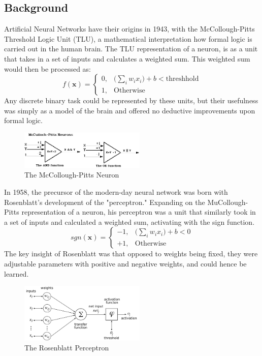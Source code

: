 \documentclass[letterpaper]{article}
\begin{document}
\subsection{Background}
Artificial Neural Networks have their origins in 1943, with the McCollough-Pitts Threshold Logic Unit (TLU), a mathematical interpretation how formal logic is carried out in the human brain.%
The TLU representation of a neuron, is as a unit that takes in a set of inputs and calculates a weighted sum. This weighted sum 
would then be processed as:
\[ 
	f(\mathbf{x}) = \begin{cases}
		0,& \big(\sum\limits_{i}w_ix_i\big) + b < \text{threshhold}\\
		1,  &\text{Otherwise}
		\end{cases}
\]
Any discrete binary task could be represented by these units, but their usefulness was simply as a model of the brain and offered no deductive 
improvements upon formal logic.
\begin{figure}[H]
	\centering
	\includegraphics[width=6cm]{mpneuron.png}
	\caption{The McCollough-Pitts Neuron}
\end{figure}
\par
In 1958, the precursor of the modern-day neural network was born with Rosenblatt's development of the "perceptron."
Expanding on the MuCollough-Pitts representation of a neuron, his perceptron was a unit that similarly took in a set of inputs and calculated a weighted sum, activating with the sign function.  
\[ 
	sgn(\mathbf{x}) = \begin{cases}
		-1,& \big(\sum\limits_{i}w_ix_i\big) + b < 0\\
		+1,  &\text{Otherwise}
		\end{cases}
\]
The key insight of Rosenblatt was that opposed to weights being fixed, they were adjustable parameters with positive and negative weights, and could hence be learned.
\begin{figure}[H]
	\centering
	\includegraphics[width=6cm]{Rosenblattperceptron.png}
	\caption{The Rosenblatt Perceptron}
\end{figure}
\end{document}
